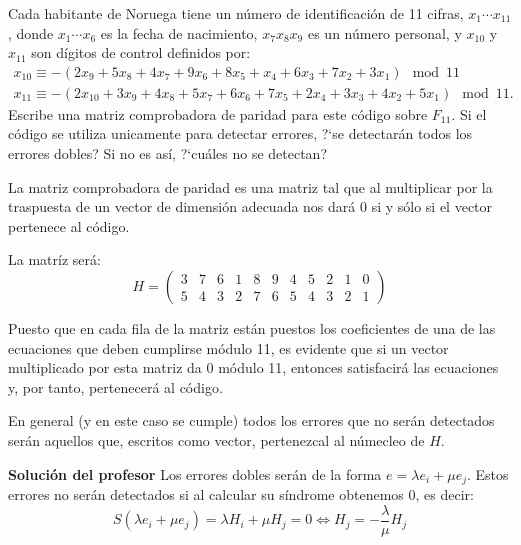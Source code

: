 \begin{problem}[12]
 Cada habitante de Noruega tiene un número de
identificación de 11 cifras, $x_1\cdots x_{11}$, donde $x_1\cdots
x_6$ es la fecha de nacimiento, $x_7x_8x_9$ es un número personal,
y $x_{10}$ y $x_{11}$ son dígitos de control definidos por:
$$\begin{array}{l}
x_{10}\equiv  -(2x_9+5x_8+4x_7+9x_6+8x_5+x_4+6x_3+7x_2+3x_1) \mod 11\\
x_{11}\equiv -(2x_{10}+
3x_9+4x_8+5x_7+6x_6+7x_5+2x_4+3x_3+4x_2+5x_1) \mod 11.\end{array}
$$
Escribe una matriz comprobadora de paridad para este código sobre
$ F_{11}$. Si el código se utiliza unicamente para detectar
errores, ?`se detectarán todos los errores dobles? Si no es así,
?`cuáles no se detectan?

\solution


La matriz comprobadora de paridad es una matriz tal que al multiplicar por la traspuesta de un vector de dimensión adecuada nos dará 0 si y sólo si el vector pertenece al código.

La matríz será:
\[H =\left(\begin{array}{ccccccccccc}
3 &  7  &  6  &  1  &  8  &  9  &  4  &  5  &  2  &  1 &  0 \\
5 & 4 & 3 & 2 & 7 & 6 & 5 & 4 & 3 &  2  & 1
\end{array}\right)\]

Puesto que en cada fila de la matriz están puestos los coeficientes de una de las ecuaciones que deben cumplirse módulo 11, es evidente que si un vector multiplicado por esta matriz da 0 módulo 11, entonces satisfacirá las ecuaciones y, por tanto, pertenecerá al código.

En general (y en este caso se cumple) todos los errores que no serán detectados serán aquellos que, escritos como vector, pertenezcal al númecleo de $H$.

\textbf{Solución del profesor}
Los errores dobles serán de la forma $e=λe_i+μe_j$. Estos errores no serán detectados si al calcular su síndrome obtenemos 0, es decir:
\[S(λe_i+μe_j)=λH_i+μH_j=0 \iff H_j = -\frac{λ}{μ}H_j\]
\end{problem}

